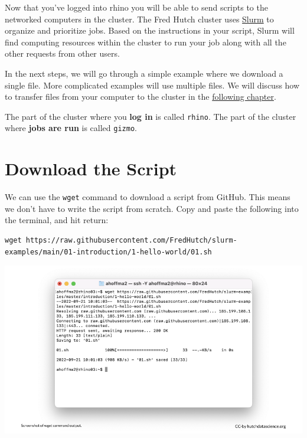 \documentclass[
]{book}
\begin{document}
Now that you've logged into rhino you will be able to send scripts to the networked computers in the cluster. The Fred Hutch cluster uses \href{https://slurm.schedmd.com/overview.html}{Slurm} to organize and prioritize jobs. Based on the instructions in your script, Slurm will find computing resources within the cluster to run your job along with all the other requests from other users.

In the next steps, we will go through a simple example where we download a single file. More complicated examples will use multiple files. We will discuss how to transfer files from your computer to the cluster in the \protect\hyperlink{file-upload-and-download}{following chapter}.

The part of the cluster where you \textbf{log in} is called \texttt{rhino}.
The part of the cluster where \textbf{jobs are run} is called \texttt{gizmo}.

\hypertarget{download-the-script}{%
\section{Download the Script}\label{download-the-script}}

We can use the \texttt{wget} command to download a script from GitHub. This means we don't have to write the script from scratch. Copy and paste the following into the terminal, and hit return:

\begin{verbatim}
wget https://raw.githubusercontent.com/FredHutch/slurm-examples/main/01-introduction/1-hello-world/01.sh
\end{verbatim}

\includegraphics[width=1\linewidth]{resources/images/05-first-job_files/figure-latex//1BQxrVYdKZTbpCaF-i_q9w7s9x034lEXpQZDU-Sl09cs_g1579ffd7b01_0_0}
\end{document}
